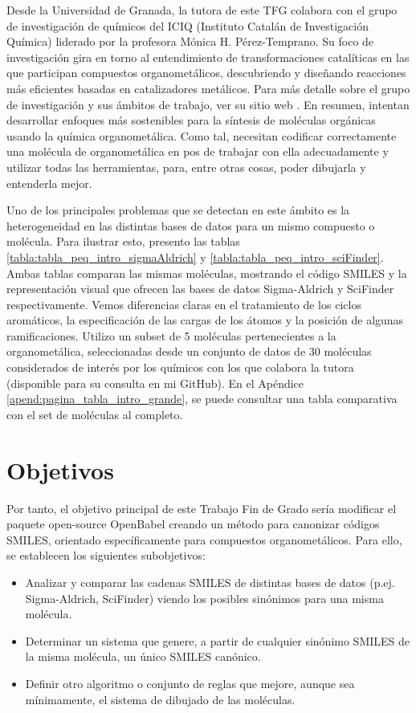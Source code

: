 Desde la Universidad de Granada, la tutora de este TFG colabora con el grupo de investigación de químicos del ICIQ (Instituto Catalán de Investigación Química) liderado por la profesora Mónica H. Pérez-Temprano. Su foco de investigación gira en torno al entendimiento de transformaciones catalíticas en las que participan compuestos organometálicos, descubriendo y diseñando reacciones más eficientes basadas en catalizadores metálicos. Para más detalle sobre el grupo de investigación y sus ámbitos de trabajo, ver su sitio web \cite{ICIQ}. En resumen, intentan desarrollar enfoques más sostenibles para la síntesis de moléculas orgánicas usando la química organometálica. Como tal, necesitan codificar correctamente una molécula de organometálica en pos de trabajar con ella adecuadamente y utilizar todas las herramientas, para, entre otras cosas, poder dibujarla y entenderla mejor.


Uno de los principales problemas que se detectan en este ámbito es la heterogeneidad en las distintas bases de datos para un mismo compuesto o molécula. Para ilustrar esto, presento las tablas \ref{tabla:tabla_peq_intro_sigmaAldrich} y \ref{tabla:tabla_peq_intro_sciFinder}. Ambas tablas comparan las mismas moléculas, mostrando el código SMILES y la representación visual que ofrecen las bases de datos Sigma-Aldrich y SciFinder respectivamente. Vemos diferencias claras en el tratamiento de los ciclos aromáticos, la especificación de las cargas de los átomos y la posición de algunas ramificaciones. Utilizo un subset de 5 moléculas pertenecientes a la organometálica, seleccionadas desde un conjunto de datos de 30 moléculas considerados de interés por los químicos con los que colabora la tutora (disponible para su consulta en mi GitHub). En el Apéndice \ref{apend:pagina_tabla_intro_grande}, se puede consultar una tabla comparativa con el set de moléculas al completo. 














\section{Objetivos}
Por tanto, el objetivo principal de este Trabajo Fin de Grado sería modificar el paquete open-source OpenBabel creando un método para canonizar códigos SMILES, orientado específicamente para compuestos organometálicos. Para ello, se establecen los siguientes subobjetivos:
\begin{itemize}
    \item Analizar y comparar las cadenas SMILES de distintas bases de datos (p.ej. Sigma-Aldrich, SciFinder) viendo los posibles sinónimos para una misma molécula.
    \item Determinar un sistema que genere, a partir de cualquier sinónimo SMILES de la misma molécula, un único SMILES canónico.
    \item Definir otro algoritmo o conjunto de reglas que mejore, aunque sea mínimamente, el sistema de dibujado de las moléculas.
\end{itemize} 


